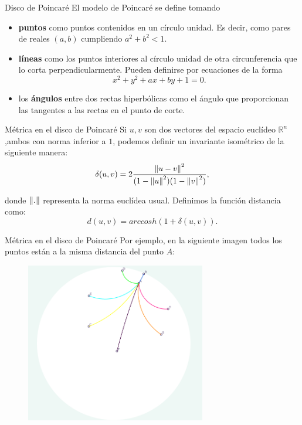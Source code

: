\documentclass[compress]{beamer}
\newcommand{\norm}[1]{\ensuremath\left\Vert #1 \right\Vert}
\begin{document}
\begin{frame}{Disco de Poincaré}
  El modelo de Poincaré se define tomando

  \begin{itemize}
  \item \textbf{puntos} como puntos contenidos en un círculo unidad. Es decir,
    como pares de reales $(a,b)$ cumpliendo $a^2+b^2 < 1$.
    \pause
  \item \textbf{líneas} como los puntos interiores al círculo unidad de otra circunferencia
    que lo corta perpendicularmente. Pueden definirse por ecuaciones de la forma
    \[x^2+y^2+ax+by+1=0.\]
    \pause
  \item los \textbf{ángulos} entre dos rectas hiperbólicas como el ángulo que
    proporcionan las tangentes a las rectas en el punto de corte.
  \end{itemize}
\end{frame}

\begin{frame}{Métrica en el disco de Poincaré}
  Si $u,v$ son dos vectores del espacio euclídeo $\mathbb{R}^n$,ambos
  con norma inferior a $1$, podemos definir un invariante isométrico de
  la siguiente manera:
  \[\delta (u,v)=2\frac{\norm{u-v}^2}{(1-\norm{u}^2)(1-\norm{v}^2)},\]

  donde $\norm{.}$ representa la norma euclídea usual. Definimos la
  función distancia como:
  \[d(u,v)=arccosh(1+\delta(u,v)).\]
\end{frame}

\begin{frame}{Métrica en el disco de Poincaré}
  Por ejemplo, en la siguiente imagen todos los puntos están a la misma
  distancia del punto $A$:

  \begin{figure}[ht!]
    \centering
    \includegraphics[width=0.7\textwidth]{Distancias.png}
  \end{figure}
\end{frame}
\end{document}

